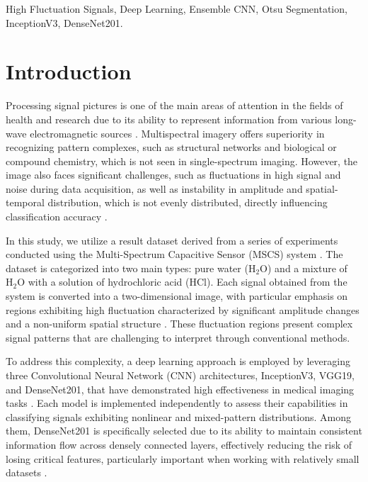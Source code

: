 \documentclass[conference]{IEEEtran}
\begin{document}
\begin{IEEEkeywords}
High Fluctuation Signals, Deep Learning, Ensemble CNN, Otsu Segmentation, InceptionV3, DenseNet201.
\end{IEEEkeywords}

\section{Introduction}
Processing signal pictures is one of the main areas of attention in the fields of health and research due to its ability to represent information from various long-wave electromagnetic sources \cite{ref1, ref2}. Multispectral imagery offers superiority in recognizing pattern complexes, such as structural networks and biological or compound chemistry, which is not seen in single-spectrum imaging. However, the image also faces significant challenges, such as fluctuations in high signal and noise during data acquisition, as well as instability in amplitude and spatial-temporal distribution, which is not evenly distributed, directly influencing classification accuracy \cite{ref2, ref3}.

In this study, we utilize a result dataset derived from a series of experiments conducted using the Multi-Spectrum Capacitive Sensor (MSCS) system \cite{ref3, ref4}. The dataset is categorized into two main types: pure water ($\text{H}_2\text{O}$) and a mixture of $\text{H}_2\text{O}$ with a solution of hydrochloric acid (HCl). Each signal obtained from the system is converted into a two-dimensional image, with particular emphasis on regions exhibiting high fluctuation characterized by significant amplitude changes and a non-uniform spatial structure \cite{ref21, ref22}. These fluctuation regions present complex signal patterns that are challenging to interpret through conventional methods. 

To address this complexity, a deep learning approach is employed by leveraging three Convolutional Neural Network (CNN) architectures, InceptionV3, VGG19, and DenseNet201, that have demonstrated high effectiveness in medical imaging tasks \cite{ref5, ref6, ref9}. Each model is implemented independently to assess their capabilities in classifying signals exhibiting nonlinear and mixed-pattern distributions. Among them, DenseNet201 is specifically selected due to its ability to maintain consistent information flow across densely connected layers, effectively reducing the risk of losing critical features, particularly important when working with relatively small datasets \cite{ref9}.
\end{document}
